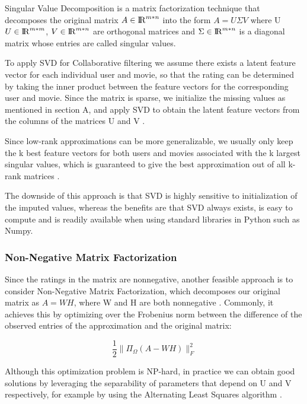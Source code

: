 \documentclass[10pt,conference,compsocconf]{IEEEtran}
\begin{document}
    Singular Value Decomposition is a matrix factorization technique that decomposes the original matrix $A \in {\rm I\!R}^{m*n} $ into the form $ A = U \Sigma V $ where U  $U \in {\rm I\!R}^{m*m}$,  $V  \in {\rm I\!R}^{m*n}$ are orthogonal matrices and $\Sigma \in {\rm I\!R}^{m*n}$ is a diagonal matrix whose entries are called singular values.

    To apply SVD for Collaborative filtering we assume there exists a latent feature vector for each individual user and movie, so that the rating can be determined by taking the inner product between the feature vectors for the corresponding user and movie. Since the matrix is sparse, we initialize the missing values as mentioned in section A, and apply SVD to obtain the latent feature vectors from the columns of the matrices U and V \cite{svd}.

    Since low-rank approximations can be more generalizable, we usually only keep the k best feature vectors for both users and movies associated with the k largest singular values, which is guaranteed to give the best approximation out of all k-rank matrices \cite{Eckart1936}.

    The downside of this approach is that SVD is highly sensitive to initialization of the imputed values, whereas the benefits are that SVD always exists, is easy to compute and is readily available when using standard libraries in Python such as Numpy.

    \subsubsection{Non-Negative Matrix Factorization}

    Since the ratings in the matrix are nonnegative, another feasible approach is to consider Non-Negative Matrix Factorization, which decomposes our original matrix as $A = WH$, where W and H are both nonnegative \cite{gillis2014nonnegative}. Commonly, it achieves this by optimizing over the Frobenius norm between the difference of the observed entries of the approximation and the original matrix:

    $$ \frac{1}{2}\|\Pi_{\Omega}(A - WH)\|^2_F$$

    Although this optimization problem is NP-hard, in practice we can obtain good solutions by leveraging the separability of parameters that depend on U and V respectively, for example by using the Alternating Least Squares algorithm \cite{als}.
\end{document}
